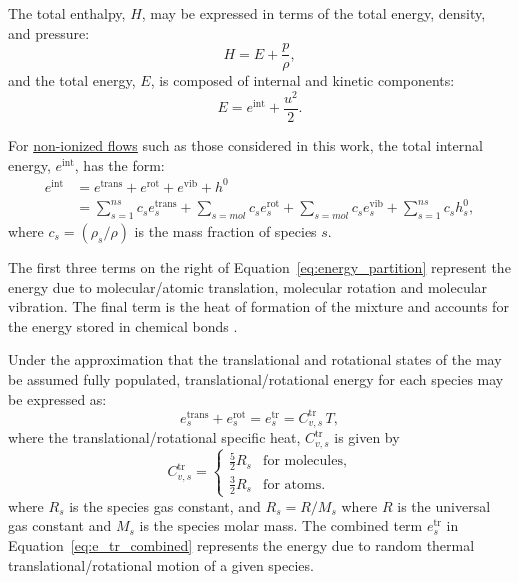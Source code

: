 \documentclass[10pt]{article}
\begin{document}
The total enthalpy, $H$, may be expressed in terms of the total energy, density, and pressure:
$$H = E + \dfrac{p}{\rho},$$
and the total energy, $E$, is composed of internal and kinetic components: $$E = e^{\text{int}} + \dfrac{ u^2 }{2}.$$

For \underline{non-ionized flows} such as those considered in this work, the total internal energy, $e^{\text{int}}$, has the form:
\begin{align}
 e^{\text{int}} &= e^{\text{trans}} + e^{\text{rot}} + e^{\text{vib}}  + h^0 \\
 &= \sum_{s=1}^{ns} c_s e^{\text{trans}}_s + \sum_{s=mol} c_s e^{\text{rot}}_s + \sum_{s=mol} c_s e^{\text{vib}}_s + \sum_{s=1}^{ns} c_s h^0_s ,
\label{eq:energy_partition}
\end{align}
where $c_s=\left(\rho_s/\rho\right)$ is the mass fraction of species $s$.

The first three terms on the right of Equation~\eqref{eq:energy_partition} represent the energy due to molecular/atomic translation, molecular rotation and  molecular vibration. The final term is the heat of formation of the mixture and accounts for the energy stored in chemical bonds \citep{Ait1996,Kirk2009}.

Under the approximation that the translational and rotational states of the may be assumed fully populated, translational/rotational energy for each species may be expressed as:
\begin{equation}
 \label{eq:e_tr_combined}
 e^{\text{trans}}_s + e^{\text{rot}}_s = e^{\text{tr}}_s = C^{\text{tr}}_{v,s}\, T ,
\end{equation}
where the translational/rotational specific heat, $C^{\text{tr}}_{v,s}$ is given by
\begin{equation}
 C^{\text{tr}}_{v,s} =
 \begin{cases}
 \frac{5}{2} R_s & \text{for molecules}, \\
 \frac{3}{2} R_s & \text{for atoms.}
 \end{cases}
\end{equation}
where $R_s$ is the species gas constant, and $R_s = R/M_s$ where $R$ is the universal gas constant and $M_s$ is the species molar mass. The combined term $e^{\text{tr}}_s$ in Equation~\eqref{eq:e_tr_combined} represents the energy due to random thermal translational/rotational motion of a given species.
\end{document}
